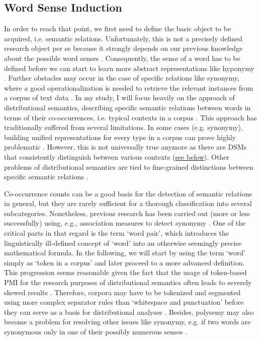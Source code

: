 \documentclass[runningheads]{llncs}
\begin{document}
\subsection{Word Sense Induction}
\label{polysemyProblemForSemanticRelations}
In order to reach that point, we first need to define the basic object to be acquired, i.e. semantic relations. Unfortunately, this is not a precisely defined research object per se because it strongly depends on our previous knowledge about the possible word senses \parencite[12]{ayseExtractionSemanticWord2011}. Consequently, the sense of a word has to be defined before we can start to learn more abstract representations like hyponymy \parencite[137]{bartunovBreakingSticksAmbiguities2016}. Further obstacles may occur in the case of specific relations like synonymy, where a good operationalization is needed to retrieve the relevant instances from a corpus of text data \parencite[274]{divjakCorpusbasedCognitiveSemantics2009}. In my study, I will focus heavily on the approach of distributional semantics, describing specific semantic relations between words in terms of their co-occurrences, i.e. typical contexts in a corpus \parencites[162]{harrisDistributionalStructure1954}[30]{firthSynopsisLinguisticTheory1957}. This approach has traditionally suffered from several limitations. In some cases (e.g. synonymy), building unified representations for every type in a corpus can prove highly problematic \parencite[114]{karanDistributionalSemanticsApproach2012}. However, this is not universally true anymore as there are \gls{DSM}s that consistently distinguish between various contexts (\hyperlink{ELMO}{see below}). Other problems of distributional semantics are tied to fine-grained distinctions between specific semantic relations \parencite[115]{karanDistributionalSemanticsApproach2012}.

Co-occurrence counts can be a good basis for the detection of semantic relations in general, but they are rarely sufficient for a thorough classification into several subcategories. Nonetheless, previous research has been carried out (more or less successfully) using, e.g., association measures to detect synonymy \parencite[566]{hagiwaraSupervisedSynonymAcquisition2009}. One of the critical parts in that regard is the term `word pair', which introduces the linguistically ill-defined concept of `word' into an otherwise seemingly precise mathematical formula. In the following, we will start by using the term `word' simply as `token in a corpus' and later proceed to a more advanced definition. This progression seems reasonable given the fact that the usage of token-based \gls{PMI} for the research purposes of distributional semantics often leads to severely skewed results \parencite[444]{herbelotMeasuringSemanticContent2013}. Therefore, corpora may have to be tokenized and segmented using more complex separator rules than `whitespace and punctuation' before they can serve as a basis for distributional analyses \parencite[6]{mikolovDistributedRepresentationsWords2013}. Besides, polysemy may also become a problem for resolving other issues like synonymy, e.g. if two words are synonymous only in one of their possibly numerous senses \parencite[444]{herbelotMeasuringSemanticContent2013}. 
\end{document}
